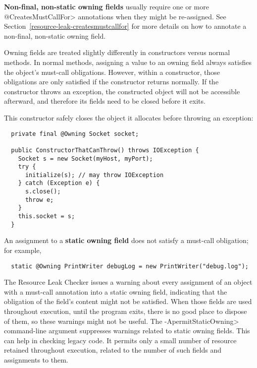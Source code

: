 \textbf{Non-final, non-static owning fields} usually require one or more \<@CreatesMustCallFor> annotations
when they might be re-assigned. See Section~\ref{resource-leak-createsmustcallfor} for
more details on how to annotate a non-final, non-static owning field.

Owning fields are treated slightly differently in constructors versus normal methods.
In normal methods, assigning a value to an owning field always satisfies the object's
must-call obligations.  However, within a constructor, those obligations are only
satisfied if the constructor returns normally.  If the constructor throws an exception,
the constructed object will not be accessible afterward, and therefore its fields need
to be closed before it exits.

This constructor safely closes the object it allocates before throwing an exception:
\begin{verbatim}
  private final @Owning Socket socket;

  public ConstructorThatCanThrow() throws IOException {
    Socket s = new Socket(myHost, myPort);
    try {
      initialize(s); // may throw IOException
    } catch (Exception e) {
      s.close();
      throw e;
    }
    this.socket = s;
  }
\end{verbatim}

An assignment to a \textbf{static owning field} does not satisfy a
must-call obligation; for example,

\begin{smaller}
\begin{Verbatim}
  static @Owning PrintWriter debugLog = new PrintWriter("debug.log");
\end{Verbatim}
\end{smaller}

\noindent
The Resource Leak Checker issues a warning about every assignment of an
object with a must-call annotation into a static owning field,
indicating that the obligation of the field's content might not be
satisfied.  When those fields are used throughout execution, until the
program exits, there is no good place to dispose of them, so these warnings
might not be useful.  The \<-ApermitStaticOwning> command-line argument
suppresses warnings related to static owning fields.  This can help in
checking legacy code.  It permits only a small number of resource retained
throughout execution, related to the number of such fields and assignments
to them.



